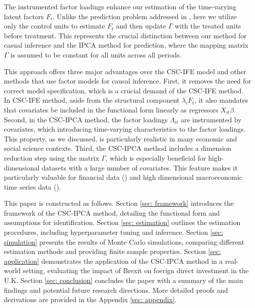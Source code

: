 \documentclass[12pt]{article}
\begin{document}
The instrumented factor loadings enhance our estimation of the time-varying latent factors $F_t$. Unlike the prediction problem addressed in \cite{kelly2020instrumented,kelly2019characteristics}, here we utilize only the control units to estimate $F_t$ and then update $\Gamma$ with the treated units before treatment. This represents the crucial distinction between our method for casual inference and the IPCA method for prediction, where the mapping matrix $\Gamma$ is assumed to be constant for all units across all periods. 

This approach offers three major advantages over the CSC-IFE model and other methods that use factor models for causal inference. First, it removes the need for correct model specification, which is a crucial demand of the CSC-IFE method. In CSC-IFE method, aside from the structural component $\lambda_i F_t$, it also mandates that covariates be included in the functional form linearly as regressors $X_{it}\beta$. Second, in the CSC-IPCA method, the factor loadings $\Lambda_{it}$ are instrumented by covariates, which introducing time-varying characteristics to the factor loadings. This property, as we discussed, is particularly realistic in many economic and social science contexts. Third, the CSC-IPCA method includes a dimension reduction step using the matrix $\Gamma$, which is especially beneficial for high-dimensional datasets with a large number of covariates. This feature makes it particularly valuable for financial data (\cite{feng2020taming}) and high dimensional macroeconomic time series data (\cite{brave2009chicago}).

This paper is constructed as follows. Section \ref{sec: framework} introduces the framework of the CSC-IPCA method, detailing the functional form and assumptions for identification. Section \ref{sec: estimation} outlines the estimation procedures, including hyperparameter tuning and inference. Section \ref{sec: simulation} presents the results of Monte Carlo simulations, comparing different estimation methods and providing finite sample properties. Section \ref{sec: application} demonstrates the application of the CSC-IPCA method in a real-world setting, evaluating the impact of Brexit on foerign direct investment in the U.K. Section \ref{sec: conclusion} concludes the paper with a summary of the main findings and potential future research directions. More detailed proofs and derivations are provided in the Appendix \ref{sec: appendix}.

\end{document}
